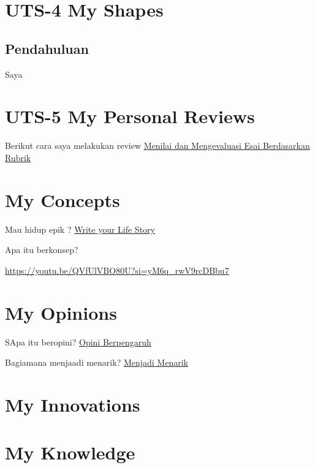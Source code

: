 \documentclass[
  letterpaper,
  DIV=11,
  numbers=noendperiod]{scrreprt}
\begin{document}
\chapter{UTS-4 My Shapes}\label{uts-4-my-shapes}

\section{Pendahuluan}\label{pendahuluan-1}

Saya


\chapter{UTS-5 My Personal Reviews}\label{uts-5-my-personal-reviews}

Berikut cara saya melakukan review
\href{./Doc.5.Mengevaluasi-Esai-Berdasarkan-Rubrik.pdf}{Menilai dan
Mengevaluasi Esai Berdasarkan Rubrik}


\chapter{My Concepts}\label{my-concepts}

Mau hidup epik ? \href{lifestory.pdf}{Write your Life Story}

Apa itu berkonsep?

\url{https://youtu.be/QVfUlVBO80U?si=yM6q_rwV9rcDBbu7}


\chapter{My Opinions}\label{my-opinions}

SApa itu beropini? \href{BM\%20Opini.mp4}{Opini Berpengaruh}

Bagiamana menjaadi menarik? \href{./Interesting.mp4}{Menjadi Menarik}


\chapter{My Innovations}\label{my-innovations}


\chapter{My Knowledge}\label{my-knowledge}
\end{document}
